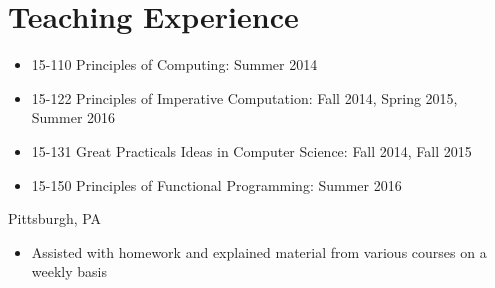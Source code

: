 \documentclass[11pt,letterpaper,sans,final]{moderncv}
\begin{document}
\section{Teaching Experience}
    {
      \begin{itemize}
        \item 15-110 Principles of Computing: Summer 2014
        \item 15-122 Principles of Imperative Computation: Fall 2014,
          Spring 2015, Summer 2016
        \item 15-131 Great Practicals Ideas in Computer Science: Fall 2014, Fall 2015
        \item 15-150 Principles of Functional Programming: Summer 2016
      \end{itemize}
    }
    {Pittsburgh, PA}{}{
      \begin{itemize}
        \item Assisted with homework and explained material from various courses
          on a weekly basis
      \end{itemize}
    }
\end{document}
